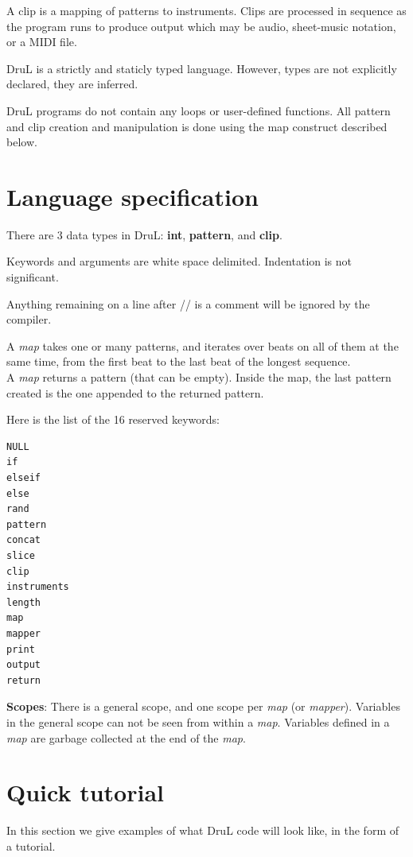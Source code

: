 \documentclass[11pt,twoside]{article}
\begin{document}
A clip is a mapping of patterns to instruments. Clips are processed in sequence as the program runs to produce output which may be audio, sheet-music notation, or a MIDI file.

DruL is a strictly and staticly typed language. However, types are not explicitly declared, they are inferred.

DruL programs do not contain any loops or user-defined functions.  All pattern 
and clip creation and manipulation is done using the map construct described below.

\section{Language specification}
There are $3$ data types in DruL: \textbf{int}, \textbf{pattern},
and \textbf{clip}.

Keywords and arguments are white space delimited. Indentation is not significant.

Anything remaining on a line after // is a comment will be ignored by the compiler.

A \textit{map} takes one or many patterns, and iterates over beats on all 
of them at the same time, from the first beat to the last beat of the longest
sequence.\\
A \textit{map} returns a pattern (that can be empty). Inside the map, the last pattern
created is the one appended to the returned pattern.

Here is the list of the 16 reserved keywords:
\begin{verbatim}
NULL
if
elseif
else
rand
pattern
concat
slice
clip
instruments
length
map
mapper
print
output
return
\end{verbatim}

\textbf{Scopes}: There is a general scope, and one scope per \textit{map} 
(or \textit{mapper}). Variables in the general scope can not be seen
from within a \textit{map}. Variables defined in a \textit{map} are garbage
collected at the end of the \textit{map}.

\pagebreak

\section{Quick tutorial}
In this section we give examples of what DruL code will look like, in the form
of a tutorial.
\end{document}
